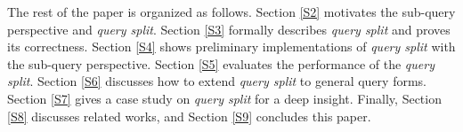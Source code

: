 The rest of the paper is organized as follows. Section \ref{S2} motivates the sub-query perspective and \textit{query split}. Section \ref{S3} formally describes \textit{query split} and proves its correctness. Section \ref{S4} shows preliminary implementations of \textit{query split} with the sub-query perspective. Section \ref{S5} evaluates the performance of the \textit{query split}. Section \ref{S6} discusses how to extend \textit{query split} to general query forms. Section \ref{S7} gives a case study on \textit{query split} for a deep insight. Finally, Section \ref{S8} discusses related works, and Section \ref{S9} concludes this paper.